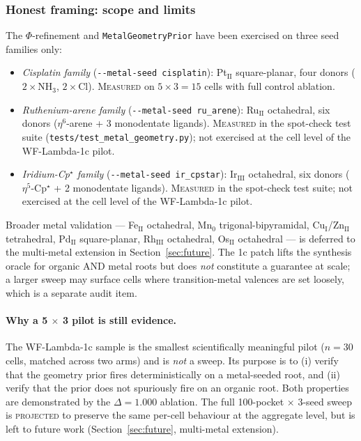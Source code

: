 \subsubsection{Honest framing: scope and limits}
\label{sec:metal-geom-honest}

The $\Phi$-refinement and \texttt{MetalGeometryPrior} have been
exercised on three seed families only:
\begin{itemize}
  \item \emph{Cisplatin family} (\texttt{-{}-metal-seed cisplatin}):
    Pt$_{\text{II}}$ square-planar, four donors
    ($2 \times \mathrm{NH}_{3}$, $2 \times \mathrm{Cl}$).
    \textsc{Measured} on $5 \times 3 = 15$ cells with full
    control ablation.
  \item \emph{Ruthenium-arene family} (\texttt{-{}-metal-seed
    ru\_arene}): Ru$_{\text{II}}$ octahedral, six donors
    ($\eta^{6}$-arene + 3 monodentate ligands). \textsc{Measured}
    in the spot-check test suite
    (\texttt{tests/test\_metal\_geometry.py}); not exercised at
    the cell level of the WF-Lambda-1c pilot.
  \item \emph{Iridium-Cp$^{\star}$ family} (\texttt{-{}-metal-seed
    ir\_cpstar}): Ir$_{\text{III}}$ octahedral, six donors
    ($\eta^{5}$-Cp$^{\star}$ + 2 monodentate ligands). \textsc{Measured}
    in the spot-check test suite; not exercised at the cell level
    of the WF-Lambda-1c pilot.
\end{itemize}
Broader metal validation --- Fe$_{\text{II}}$ octahedral,
Mn$_{\text{0}}$ trigonal-bipyramidal, Cu$_{\text{I}}$/Zn$_{\text{II}}$
tetrahedral, Pd$_{\text{II}}$ square-planar, Rh$_{\text{III}}$
octahedral, Os$_{\text{II}}$ octahedral --- is deferred to the
multi-metal extension in Section~\ref{sec:future}.
The 1c patch lifts the synthesis oracle for organic AND metal roots
but does \emph{not} constitute a guarantee at scale; a larger
sweep may surface cells where transition-metal valences are set
loosely, which is a separate audit item.

\paragraph{Why a 5 $\times$ 3 pilot is still evidence.}
The WF-Lambda-1c sample is the smallest scientifically meaningful
pilot ($n = 30$ cells, matched across two arms) and is \emph{not}
a sweep. Its purpose is to (i) verify that the geometry prior fires
deterministically on a metal-seeded root, and (ii) verify that
the prior does not spuriously fire on an organic root. Both
properties are demonstrated by the $\Delta = 1.000$ ablation.
The full 100-pocket $\times$ 3-seed sweep is
\textsc{projected} to preserve the same per-cell behaviour at the
aggregate level, but is left to future work
(Section~\ref{sec:future}, multi-metal extension).

